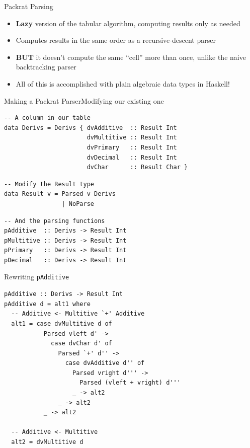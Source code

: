 \documentclass{beamer}
\begin{document}
\begin{frame}{Packrat Parsing}
  \begin{itemize}
  \item \textbf{Lazy} version of the tabular algorithm, computing
    results only as needed
  \item Computes results in the same order as a recursive-descent
    parser
  \item \textbf{BUT} it doesn't compute the same ``cell'' more than
    once, unlike the naive backtracking parser
    \pause
  \item \alert{All of this is accomplished with plain algebraic data types in
    Haskell!}
  \end{itemize}
\end{frame}

\begin{frame}[fragile]{Making a Packrat Parser}{Modifying our existing one}
\begin{verbatim}
-- A column in our table
data Derivs = Derivs { dvAdditive  :: Result Int 
                       dvMultitive :: Result Int 
                       dvPrimary   :: Result Int 
                       dvDecimal   :: Result Int 
                       dvChar      :: Result Char }
\end{verbatim}
\pause
\begin{verbatim}
-- Modify the Result type
data Result v = Parsed v Derivs 
                | NoParse
\end{verbatim}
\pause
\begin{verbatim}
-- And the parsing functions
pAdditive  :: Derivs -> Result Int 
pMultitive :: Derivs -> Result Int 
pPrimary   :: Derivs -> Result Int 
pDecimal   :: Derivs -> Result Int 
\end{verbatim}
\end{frame}

\begin{frame}[fragile]{Rewriting \texttt{pAdditive}}
\begin{verbatim}
pAdditive :: Derivs -> Result Int
pAdditive d = alt1 where
  -- Additive <- Multitive `+' Additive 
  alt1 = case dvMultitive d of
           Parsed vleft d' -> 
             case dvChar d' of
               Parsed `+' d'' ->
                 case dvAdditive d'' of
                   Parsed vright d''' ->
                     Parsed (vleft + vright) d'''
                   _ -> alt2
               _ -> alt2
           _ -> alt2

  -- Additive <- Multitive
  alt2 = dvMultitive d
\end{verbatim}
\end{frame}
\end{document}
